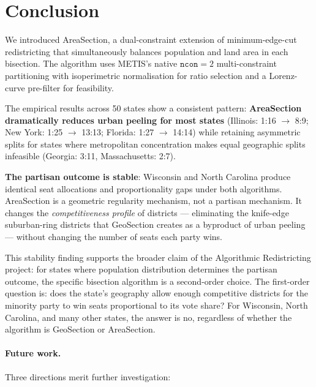 \section{Conclusion}
\label{sec:conclusion}

We introduced AreaSection, a dual-constraint extension of minimum-edge-cut
redistricting that simultaneously balances population and land area in each
bisection.
The algorithm uses METIS's native $\mathtt{ncon}=2$ multi-constraint
partitioning with isoperimetric normalisation for ratio selection and a
Lorenz-curve pre-filter for feasibility.

The empirical results across 50 states show a consistent pattern:
\textbf{AreaSection dramatically reduces urban peeling for most states}
(Illinois: 1:16 $\to$ 8:9; New York: 1:25 $\to$ 13:13;
Florida: 1:27 $\to$ 14:14) while retaining asymmetric splits for states
where metropolitan concentration makes equal geographic splits infeasible
(Georgia: 3:11, Massachusetts: 2:7).

\textbf{The partisan outcome is stable}: Wisconsin and North Carolina
produce identical seat allocations and proportionality gaps under both
algorithms.
AreaSection is a geometric regularity mechanism, not a partisan mechanism.
It changes the \emph{competitiveness profile} of districts ---
eliminating the knife-edge suburban-ring districts that GeoSection
creates as a byproduct of urban peeling --- without changing the number
of seats each party wins.

This stability finding supports the broader claim of the Algorithmic
Redistricting project: for states where population distribution determines
the partisan outcome, the specific bisection algorithm is a second-order
choice.
The first-order question is: does the state's geography allow enough
competitive districts for the minority party to win seats proportional to
its vote share?
For Wisconsin, North Carolina, and many other states, the answer is no,
regardless of whether the algorithm is GeoSection or AreaSection.

\paragraph{Future work.}
Three directions merit further investigation:

